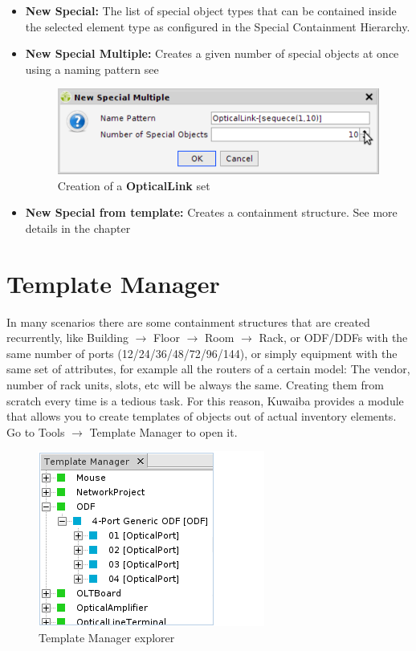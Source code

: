 \documentclass[a4paper]{article}
\begin{document}
		\begin{itemize}
			\item \textbf{New Special:} The list of special object types that can be contained inside the selected element type as configured in the Special Containment Hierarchy.
			\item \textbf{New Special Multiple:} Creates a given number of special objects at once using a naming pattern see \textbf{}
			\begin{figure}[h!]
				\centering
				\includegraphics[width=0.5\linewidth]{img/new_special_multiple.png}
				\caption{Creation of a \textbf{OpticalLink} set}
				\label{fig:new_special_multiple}
			\end{figure}			
			\item \textbf{New Special from template:} Creates a containment structure. See more details in the chapter \textbf{}
		\end{itemize}
					
	\clearpage
	\section{Template Manager} \label{sec:template_manager}
	In many scenarios there are some containment structures that are created recurrently, like Building $\rightarrow$ Floor $\rightarrow$ Room $\rightarrow$ Rack, or ODF/DDFs with the same number of ports (12/24/36/48/72/96/144), or simply equipment with the same set of attributes, for example all the routers of a certain model: The vendor, number of rack units, slots, etc will be always the same. Creating them from scratch every time is a tedious task. For this reason, Kuwaiba provides a module that allows you to create templates of objects out of actual inventory elements. Go to Tools $\rightarrow$ Template Manager to open it.
	
	\begin{figure}[h!]
		\centering
		\includegraphics[width=0.4\linewidth]{img/template_manager_intro.png}
		\caption{Template Manager explorer}
		\label{fig:template_manager_intro}
	\end{figure}
\end{document}
